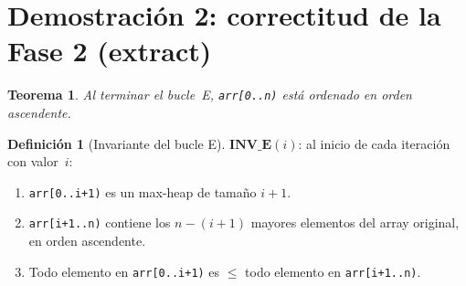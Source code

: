 \documentclass[11pt, letterpaper]{article}
\theoremstyle{definition}
\newtheorem{definition}{Definición}[section]
\theoremstyle{plain}
\newtheorem{theorem}{Teorema}[section]
\theoremstyle{remark}
\begin{document}
\section{Demostración 2: correctitud de la Fase 2 (extract)}

\begin{theorem}\label{thm:extract}
Al terminar el bucle~E, \texttt{arr[0..n)} está ordenado en orden
ascendente.
\end{theorem}

\begin{definition}[Invariante del bucle E]
$\textbf{INV\_E}(i)$: al inicio de cada iteración con valor~$i$:
\begin{enumerate}
  \item[\textbf{E1.}] \texttt{arr[0..i+1)} es un max-heap de tamaño
    $i+1$.
  \item[\textbf{E2.}] \texttt{arr[i+1..n)} contiene los $n-(i+1)$
    mayores elementos del array original, en orden ascendente.
  \item[\textbf{E3.}] Todo elemento en \texttt{arr[0..i+1)} es $\leq$
    todo elemento en \texttt{arr[i+1..n)}.
\end{enumerate}
\end{definition}
\end{document}
